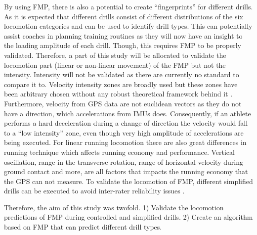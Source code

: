 \documentclass[
]{article}
\begin{document}
By using FMP, there is also a potential to create ``fingerprints'' for
different drills. As it is expected that different drills consist of
different distributions of the six locomotion categories and can be used
to identify drill types. This can potentially assist coaches in planning
training routines as they will now have an insight to the loading
amplitude of each drill. Though, this requires FMP to be properly
validated. Therefore, a part of this study will be allocated to validate
the locomotion part (linear or non-linear movement) of the FMP but not
the intensity. Intensity will not be validated as there are currently no
standard to compare it to. Velocity intensity zones are broadly used but
these zones have been arbitrary chosen without any robust theoretical
framework behind it \citep{Malone2017}. Furthermore, velocity from GPS
data are not euclidean vectors as they do not have a direction, which
accelerations from IMUs does. Consequently, if an athlete performs a
hard deceleration during a change of direction the velocity would fall
to a ``low intensity'' zone, even though very high amplitude of
accelerations are being executed. For linear running locomotion there
are also great differences in running technique which affects running
economy and performance. Vertical oscillation, range in the transverse
rotation, range of horizontal velocity during ground contact and more,
are all factors that impacts the running economy \citep{Folland2017}
that the GPS can not measure. To validate the locomotion of FMP,
different simplified drills can be executed to avoid inter-rater
reliability issues \citep{Reinking2018}.

Therefore, the aim of this study was twofold. 1) Validate the locomotion
predictions of FMP during controlled and simplified drills. 2) Create an
algorithm based on FMP that can predict different drill types.
\end{document}
